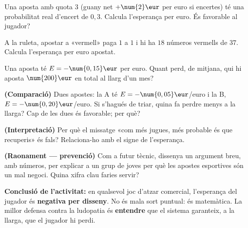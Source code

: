\begin{exercicis}
\begin{exlist}
  \item Una aposta amb quota $3$ (guany net $+\num{2}\eur$ per euro si encertes) té una
        probabilitat real d'encert de $0,3$. Calcula l'esperança per euro. És favorable
        al jugador?
  \item A la ruleta, apostar a «vermell» paga $1$ a $1$ i hi ha $18$ números vermells de
        $37$. Calcula l'esperança per euro apostat.
  \item Una aposta té $E=-\num{0,15}\eur$ per euro. Quant perd, de mitjana, qui hi
        aposta $\num{200}\eur$ en total al llarg d'un mes?
  \item \textbf{(Comparació)} Dues apostes: la A té $E=-\num{0,05}\eur$/euro i la B,
        $E=-\num{0,20}\eur$/euro. Si s'hagués de triar, quina fa perdre menys a la
        llarga? Cap de les dues és favorable; per què?
  \item \textbf{(Interpretació)} Per què el missatge «com més jugues, més probable és que
        recuperis» és fals? Relaciona-ho amb el signe de l'esperança.
  \item \textbf{(Raonament — prevenció)} Com a futur tècnic, dissenya un argument breu,
        amb números, per explicar a un grup de joves per què les apostes esportives són
        un mal negoci. Quina xifra clau faries servir?
\end{exlist}
\end{exercicis}

\begin{idea}
\textbf{Conclusió de l'activitat:} en qualsevol joc d'atzar comercial, l'esperança del
jugador és \textbf{negativa per disseny}. No és mala sort puntual: és matemàtica. La
millor defensa contra la ludopatia és \textbf{entendre} que el sistema garanteix, a la
llarga, que el jugador hi perdi.
\end{idea}

